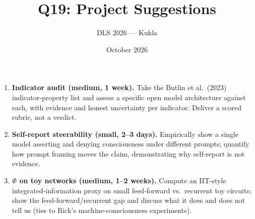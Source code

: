 \documentclass[11pt]{article}
\title{Q19: Project Suggestions}
\author{DLS 2026 --- Kukla}
\date{October 2026}
\begin{document}
\maketitle
\begin{enumerate}[leftmargin=1.5em]
\item \textbf{Indicator audit (medium, 1 week).} Take the Butlin et al.\ (2023) indicator-property list and assess a specific open model architecture against each, with evidence and honest uncertainty per indicator. Deliver a scored rubric, not a verdict.
\item \textbf{Self-report steerability (small, 2--3 days).} Empirically show a single model asserting and denying consciousness under different prompts; quantify how prompt framing moves the claim, demonstrating why self-report is not evidence.
\item \textbf{$\Phi$ on toy networks (medium, 1--2 weeks).} Compute an IIT-style integrated-information proxy on small feed-forward vs.\ recurrent toy circuits; show the feed-forward/recurrent gap and discuss what it does and does not tell us (ties to Rick's machine-consciousness experiments).
\end{enumerate}
\end{document}
